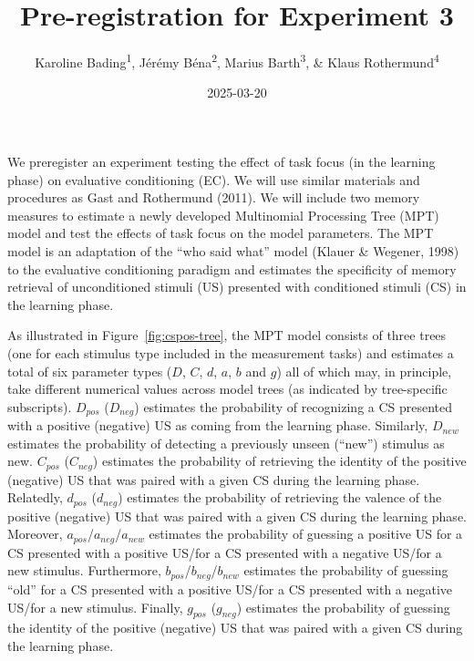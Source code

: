 \documentclass[
  doc,floatsintext]{apa6}
\title{Pre-registration for Experiment 3}
\author{Karoline Bading\textsuperscript{1}, Jérémy Béna\textsuperscript{2}, Marius Barth\textsuperscript{3}, \& Klaus Rothermund\textsuperscript{4}}
\date{2025-03-20}
\affiliation{\vspace{0.5cm}\textsuperscript{1} University of Tübingen\\\textsuperscript{2} Aix-Marseille University\\\textsuperscript{3} University of Cologne\\\textsuperscript{4} Friedrich Schiller University Jena}
\begin{document}
\maketitle

We preregister an experiment testing the effect of task focus (in the learning phase) on evaluative conditioning (EC).
We will use similar materials and procedures as Gast and Rothermund (2011).
We will include two memory measures to estimate a newly developed Multinomial Processing Tree (MPT) model and test the effects of task focus on the model parameters.
The MPT model is an adaptation of the ``who said what'' model (Klauer \& Wegener, 1998) to the evaluative conditioning paradigm and estimates the specificity of memory retrieval of unconditioned stimuli (US) presented with conditioned stimuli (CS) in the learning phase.

As illustrated in Figure~\ref{fig:cspos-tree}, the MPT model consists of three trees (one for each stimulus type included in the measurement tasks) and estimates a total of six parameter types (\(D\), \(C\), \(d\), \(a\), \(b\) and \(g\)) all of which may, in principle, take different numerical values across model trees (as indicated by tree-specific subscripts).
\(D_\mathit{pos}\) (\(D_\mathit{neg}\)) estimates the probability of recognizing a CS presented with a positive (negative) US as coming from the learning phase.
Similarly, \(D_\mathit{new}\) estimates the probability of detecting a previously unseen (``new'') stimulus as new.
\(C_\mathit{pos}\) (\(C_\mathit{neg}\)) estimates the probability of retrieving the identity of the positive (negative) US that was paired with a given CS during the learning phase.
Relatedly, \(d_\mathit{pos}\) (\(d_\mathit{neg}\)) estimates the probability of retrieving the valence of the positive (negative) US that was paired with a given CS during the learning phase.
Moreover, \(a_\mathit{pos}\)/\(a_\mathit{neg}\)/\(a_\mathit{new}\) estimates the probability of guessing a positive US for a CS presented with a positive US/for a CS presented with a negative US/for a new stimulus.
Furthermore, \(b_\mathit{pos}\)/\(b_\mathit{neg}\)/\(b_\mathit{new}\) estimates the probability of guessing ``old'' for a CS presented with a positive US/for a CS presented with a negative US/for a new stimulus.
Finally, \(g_\mathit{pos}\) (\(g_\mathit{neg}\)) estimates the probability of guessing the identity of the positive (negative) US that was paired with a given CS during the learning phase.
\end{document}
